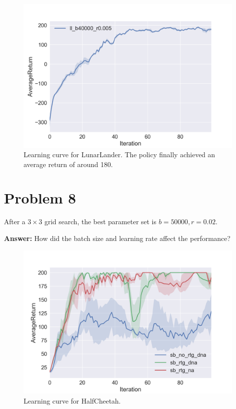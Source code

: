 \documentclass[12pt]{article}
\begin{document}
\begin{figure}[!h]
\centering
\includegraphics[width=5in]{Figure_4.png}
\caption{Learning curve for LunarLander. The policy finally achieved an average return of around 180.}
\end{figure}

\section{Problem 8}
After a $3 \times 3$ grid search, the best parameter set is $b = 50000, r = 0.02$.

\textbf{Answer:} How did the batch size and learning rate affect the performance?


\begin{figure}[!h]
\centering
\includegraphics[width=5in]{Figure_1.png}
\caption{Learning curve for HalfCheetah.}
\end{figure}
\end{document}
